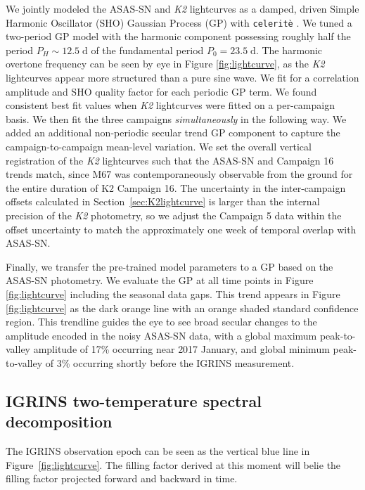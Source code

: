 \documentclass[trackchanges]{aastex631}
\begin{document}
We jointly modeled the ASAS-SN and \emph{K2} lightcurves as a damped, driven Simple Harmonic Oscillator (SHO) Gaussian Process (GP) with \texttt{celerit\`e} \citep{2017AJ....154..220F}.  We tuned a two-period GP model with the harmonic component possessing roughly half the period $P_H\sim12.5\;\mathrm{d}$ of the fundamental period $P_0=23.5\;\mathrm{d}$.  The harmonic overtone frequency can be seen by eye in Figure \ref{fig:lightcurve}, as the \emph{K2} lightcurves appear more structured than a pure sine wave.  We fit for a correlation amplitude and SHO quality factor for each periodic GP term.  We found consistent best fit values when \emph{K2} lightcurves were fitted on a per-campaign basis.  We then fit the three campaigns \emph{simultaneously} in the following way.  We added an additional non-periodic secular trend GP component to capture the campaign-to-campaign mean-level variation.  We set the overall vertical registration of the \emph{K2} lightcurves such that the ASAS-SN and Campaign 16 trends match, since M67 was contemporaneously observable from the ground for the entire duration of K2 Campaign 16. The uncertainty in the inter-campaign offsets calculated in Section~\ref{sec:K2lightcurve} is larger than the internal precision of the \emph{K2} photometry, so we adjust the Campaign 5 data within the offset uncertainty to match the approximately one week of temporal overlap with ASAS-SN.

Finally, we transfer the pre-trained model parameters to a GP based on the ASAS-SN photometry. We evaluate the GP at all time points in Figure \ref{fig:lightcurve} including the seasonal data gaps.  This trend appears in Figure \ref{fig:lightcurve} as the dark orange line with an orange shaded standard confidence region.  This trendline guides the eye to see broad secular changes to the amplitude encoded in the noisy ASAS-SN data, with a global maximum peak-to-valley amplitude of 17\% occurring near 2017 January, and global minimum peak-to-valley of 3\% occurring shortly before the IGRINS measurement.



\subsection{IGRINS two-temperature spectral decomposition}

The IGRINS observation epoch can be seen as the vertical blue line in Figure~\ref{fig:lightcurve}. The filling factor derived at this moment will belie the filling factor projected forward and backward in time.
\end{document}
